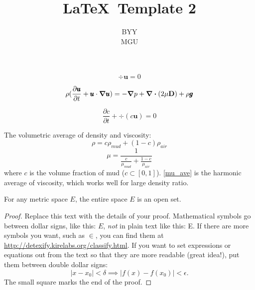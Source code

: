 \documentclass{article}
\newenvironment{theorem}[2][Theorem]{\begin{trivlist}
\item[\hskip \labelsep {\bfseries #1}\hskip \labelsep {\bfseries #2.}]}{\end{trivlist}}
\begin{document}

\title{\LaTeX\   Template 2} %
\author{BYY\\MGU} %

\maketitle

\begin{equation}
	\div{\pmb{u}}=0
	\label{ns1}
\end{equation}

\begin{equation}
	\rho(\frac{\partial \pmb{u}}{\partial t}+\pmb{u} \cdot {\grad{\pmb{u}}})=-\grad{p}+\div{(2\mu \vb{D})}+\rho \pmb{g}
	\label{ns2}
\end{equation}

\begin{equation}
	\frac{\partial c}{\partial t}+\div{(c\pmb{u})}=0
	\label{ns3}
\end{equation}	

The volumetric average of density and viscosity:
\begin{equation}
	\rho = c\rho_{mud}+(1-c)\rho_{air}
	\label{c_ave}
\end{equation}
\begin{equation}
	\mu = \frac{1}{\frac{c}{\mu_{mud}}+\frac{1-c}{\mu_{air}}}
	\label{mu_ave}
\end{equation}
where $c$ is the volume fraction of mud ($c\subset [0,1]$). \autoref{mu_ave} is the harmonic  average of viscosity, which works well for large density ratio.

%

\begin{theorem}{(Page 4 $\#$ 6)}
For any metric space $E$, the entire space $E$ is an open set.
\end{theorem}

\begin{proof}
Replace this text with the details of your proof. Mathematical symbols go between dollar signs, like this: $E$, \emph{not} in plain text like this: E. If there are more symbols you want, such as $\in$, you can find them at\\ \url{http://detexify.kirelabs.org/classify.html}. If you want to set expressions or equations out from the text so that they are more readable (great idea!), put them between double dollar signs: $$|x-x_0| < \delta \implies |f(x)-f(x_0)| < \epsilon.$$
The small square marks the end of the proof.
\end{proof}
\end{document}
